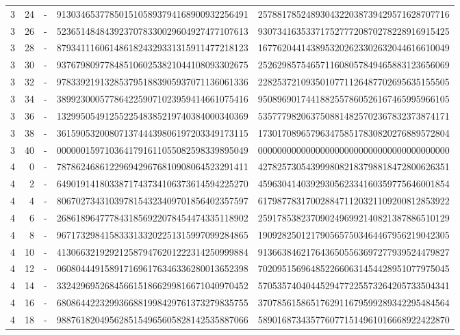 \begin{longtable}{rrrll}
3 & 24 & - & 9130346537785015105893794168900932256491 & 2578817852489304322038739429571628707716 \\
3 & 26 & - & 5236514848439237078330029604927477107613 & 9307341635337175277720870278228916915425 \\
3 & 28 & - & 8793411160614861824329331315911477218123 & 1677620441438953202623302632044616610049 \\
3 & 30 & - & 9376798097784851060253821044108093302675 & 2526298575465711608057849465883123656069 \\
3 & 32 & - & 9783392191328537951883905937071136061336 & 2282537210935010771126487702695635155505 \\
3 & 34 & - & 3899230005778642259071023959414661075416 & 9508969017441882557860526167465995966105 \\
3 & 36 & - & 1329950549125522548385219740384000340369 & 5357779820637508814825702367832373874171 \\
3 & 38 & - & 3615905320080713744439806197203349173115 & 1730170896579634758517830820276889572804 \\
3 & 40 & - & 0000001597103641791611055082598339895049 & 0000000000000000000000000000000000000000 \\
4 & 0 & - & 7878624686122969429676810908064523291411 & 4278257305439998082183798818472800626351 \\
4 & 2 & - & 6490191418033871743734106373614594225270 & 4596304140392930562334160359775646001854 \\
4 & 4 & - & 8067027343103978154323409701856402357597 & 6179877831700288471120321109200812853922 \\
4 & 6 & - & 2686189647778431856922078454474335118902 & 2591785382370902496992140821387886510129 \\
4 & 8 & - & 9671732984158333133202251315997099284865 & 1909282501217905657503464467956219042305 \\
4 & 10 & - & 4130663219292125879476201222314250999884 & 9136638462176436505563697277939524479827 \\
4 & 12 & - & 0608044491589171696176346336280013652398 & 7020951569648522660631454428951077975045 \\
4 & 14 & - & 3324296952684566151866299816671040970452 & 5705357404044529477225573264205733504341 \\
4 & 16 & - & 6808644223299366881998429761373279835755 & 3707856158651762911679599289342295484564 \\
4 & 18 & - & 9887618204956285154965605828142535887066 & 5890168734357760771514961016668922422870 \\

\end{longtable}
